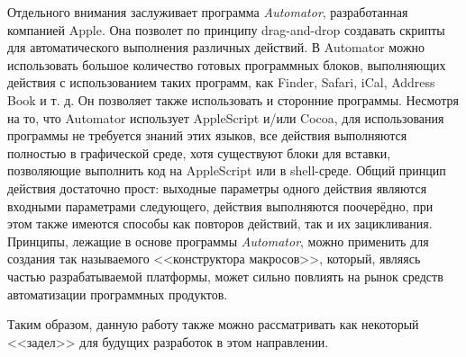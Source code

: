 Отдельного внимания заслуживает программа {\it Automator}, разработанная компанией Apple. Она позволет по принципу drag-and-drop создавать скрипты для автоматического выполнения различных действий. В Automator можно использовать большое количество готовых программных блоков, выполняющих действия с использованием таких программ, как Finder, Safari, iCal, Address Book и т. д. Он позволяет также использовать и сторонние программы. Несмотря на то, что Automator использует AppleScript и/или Cocoa, для использования программы не требуется знаний этих языков, все действия выполняются полностью в графической среде, хотя существуют блоки для вставки, позволяющие выполнить код на AppleScript или в shell-среде. Общий принцип действия достаточно прост: выходные параметры одного действия являются входными параметрами следующего, действия выполняются поочерёдно, при этом также имеются способы как повторов действий, так и их зацикливания.~\cite{automator-website} Принципы, лежащие в основе программы {\it Automator}, можно применить для создания так называемого <<конструктора макросов>>, который, являясь частью разрабатываемой платформы, может сильно повлиять на рынок средств автоматизации программных продуктов.

Таким образом, данную работу также можно рассматривать как некоторый <<задел>> для будущих разработок в этом направлении.

\pagebreak
